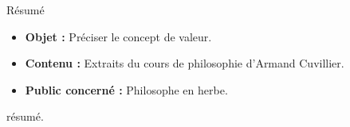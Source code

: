 \begin{center}
\Large
Résumé
\normalsize
\end{center}
\vspace{3cm}
\begin{itemize}[leftmargin=1cm, label=, itemsep=21pt]
\item {\bf Objet : } Préciser le concept de valeur.
\item {\bf Contenu : } Extraits du cours de philosophie d'Armand Cuvillier.
\item {\bf Public concerné : } Philosophe en herbe.
\end{itemize}

\vspace{3cm}

résumé.

\vspace{3cm}

